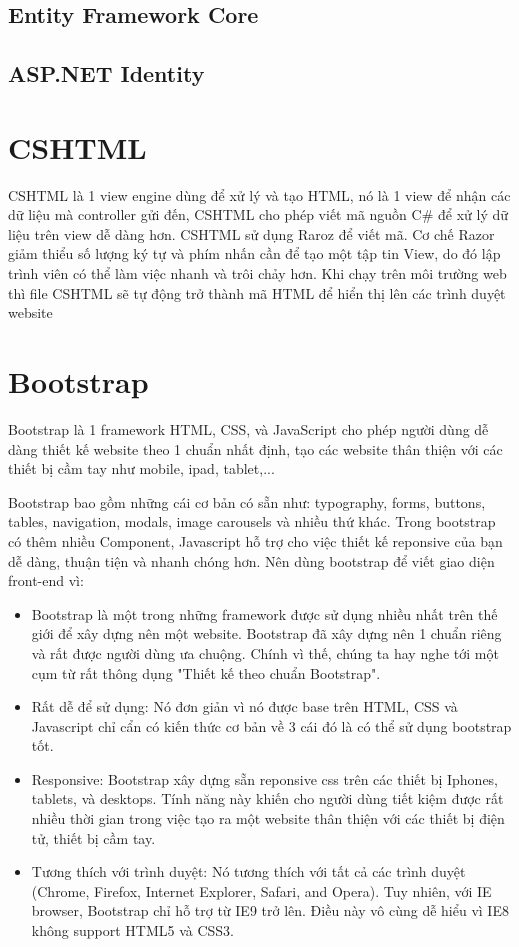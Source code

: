 \subsection{Entity Framework Core}
\subsection{ASP.NET Identity}
\section{CSHTML}
CSHTML là 1 view engine dùng để xử lý và tạo HTML, nó là 1 view để nhận các dữ liệu mà controller gửi đến, CSHTML cho phép viết mã nguồn C\# để xử lý dữ liệu trên view dễ dàng hơn. CSHTML sử dụng Raroz để viết mã. Cơ chế Razor giảm thiểu số lượng ký tự và phím nhấn cần để tạo một tập tin View, do đó lập trình viên có thể làm việc nhanh và trôi chảy hơn. Khi chạy trên môi trường web thì file CSHTML sẽ tự động trở thành mã HTML để hiển thị lên các trình duyệt website
\section{Bootstrap}
Bootstrap là 1 framework HTML, CSS, và JavaScript cho phép người dùng dễ dàng thiết kế website theo 1 chuẩn nhất định, tạo các website thân thiện với các thiết bị cầm tay như mobile, ipad, tablet,...
\par
Bootstrap bao gồm những cái cơ bản có sẵn như: typography, forms, buttons, tables, navigation, modals, image carousels và nhiều thứ khác. Trong bootstrap có thêm nhiều Component, Javascript hỗ trợ cho việc thiết kế reponsive của bạn dễ dàng, thuận tiện và nhanh chóng hơn. Nên dùng bootstrap để viết giao diện front-end vì:
\begin{itemize}
\item Bootstrap là một trong những framework được sử dụng nhiều nhất trên thế giới để xây dựng nên một website. Bootstrap đã xây dựng nên 1 chuẩn riêng và rất được người dùng ưa chuộng. Chính vì thế, chúng ta hay nghe tới một cụm từ rất thông dụng "Thiết kế theo chuẩn Bootstrap".
\item Rất dễ để sử dụng: Nó đơn giản vì nó được base trên HTML, CSS và Javascript chỉ cẩn có kiến thức cơ bản về 3 cái đó là có thể sử dụng bootstrap tốt.
\item Responsive: Bootstrap xây dựng sẵn reponsive css trên các thiết bị Iphones, tablets, và desktops. Tính năng này khiến cho người dùng tiết kiệm được rất nhiều thời gian trong việc tạo ra một website thân thiện với các thiết bị điện tử, thiết bị cầm tay.
\item Tương thích với trình duyệt: Nó tương thích với tất cả các trình duyệt (Chrome, Firefox, Internet Explorer, Safari, and Opera). Tuy nhiên, với IE browser, Bootstrap chỉ hỗ trợ từ IE9 trở lên. Điều này vô cùng dễ hiểu vì IE8 không support HTML5 và CSS3.
\end{itemize}

